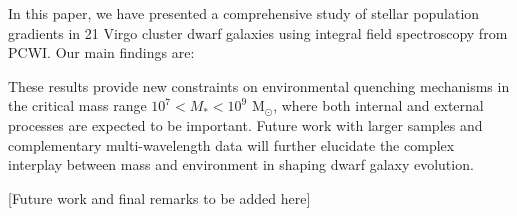 \documentclass[linenumbers,trackchanges,twocolumn]{aastex631}
\begin{document}
In this paper, we have presented a comprehensive study of stellar population gradients in 21 Virgo cluster dwarf galaxies using integral field spectroscopy from PCWI. Our main findings are:


These results provide new constraints on environmental quenching mechanisms in the critical mass range $10^7 < M_* < 10^9$ M$_{\odot}$, where both internal and external processes are expected to be important. Future work with larger samples and complementary multi-wavelength data will further elucidate the complex interplay between mass and environment in shaping dwarf galaxy evolution.

[Future work and final remarks to be added here]




\end{document}
